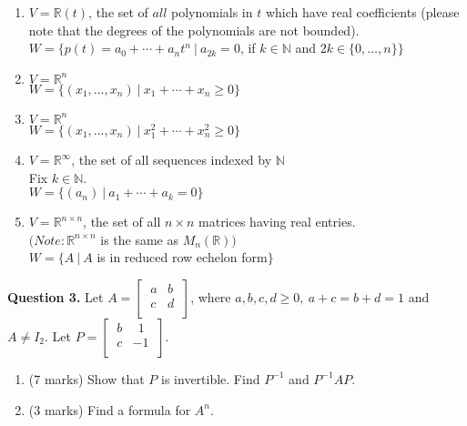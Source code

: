 \documentclass{article}
\newcommand{\R}{\mathbb{R}}
\newcommand{\N}{\mathbb{N}}
\begin{document}
\begin{enumerate}[label=(\alph*), leftmargin=6.25mm]
    \item
    $V = \R(t)$, the set of $all$ polynomials in $t$ which have real coefficients (please note that the degrees of the polynomials are not bounded). \\
    $W = \{ p(t) = a_0 + \cdots + a_nt^n \ |\ a_{2k} = 0$, if $k \in \N$ and $2k \in \{ 0, \ldots, n \} \}$

    \item
    $V = \R^n$ \\
    $W = \{ (x_1, \ldots, x_n)\ |\ x_1 + \cdots + x_n \ge 0 \}$

    \item
    $V = \R^n$ \\
    $W = \{ (x_1, \ldots, x_n)\ |\ x_1^2 + \cdots + x_n^2 \ge 0 \}$

    \item
    $V = \R^\infty$, the set of all sequences indexed by $\N$ \\
    Fix $k \in \N.$ \\
    $W = \{ (a_n)\ |\ a_1 + \cdots + a_k = 0 \}$

    \item
    $V = \R^{n \times n}$, the set of all $n \times n$ matrices having real entries. \\
    $(Note: \R^{n \times n}$ is the same as $M_n(\R) )$ \\
    $W = \{ A\ |\ A$ is in reduced row echelon form$\}$
\end{enumerate}

\newpage

\textbf{Question 3.} Let $A = \begin{bmatrix}
    \ a & b\ \\
    \ c & d\ \\
\end{bmatrix}$, where $a, b, c, d \ge 0,\ a + c = b + d = 1$ and $A \neq I_2$. Let $ P = \begin{bmatrix}
    \ b &\ \ 1\ \\
    \ c & -1\ \\
\end{bmatrix}$.

\begin{enumerate}[label=(\alph*), leftmargin=6.25mm]
    \item (7 marks)
    Show that $P$ is invertible. Find $P^{-1}$ and $P^{-1}AP$.

    \item (3 marks)
    Find a formula for $A^n$. \\[8mm]
\end{enumerate}
\end{document}
